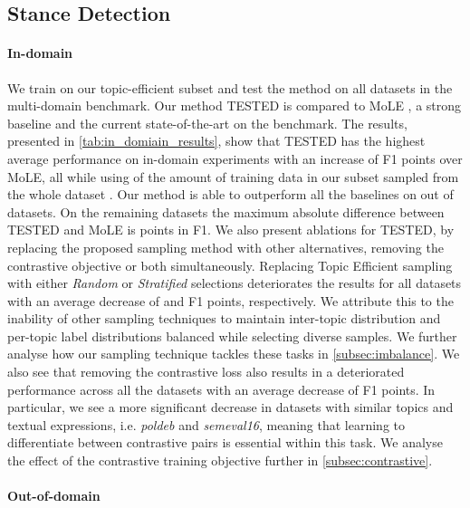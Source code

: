 \documentclass[11pt]{article}
\begin{document}
\subsection{Stance Detection}

\paragraph{In-domain}

We train on our topic-efficient subset  and test the method on all datasets  in the multi-domain benchmark. Our method TESTED is compared to MoLE \citep{hardalov2021cross}, a strong baseline and the current state-of-the-art on the benchmark. The results, presented in \autoref{tab:in_domiain_results}, show that TESTED has the highest average performance on in-domain experiments with an increase of  F1 points over MoLE, all while using  of the amount of training data in our subset  sampled from the whole dataset . Our method is able to outperform all the baselines on  out of  datasets. On the remaining  datasets the maximum absolute difference between TESTED and MoLE is  points in F1. We also present ablations for TESTED, by replacing the proposed sampling method with other alternatives, removing the contrastive objective or both simultaneously. Replacing Topic Efficient sampling with either \emph{Random} or \emph{Stratified} selections deteriorates the results for all datasets with an average decrease of  and  F1 points, respectively. We attribute this to the inability of other sampling techniques to maintain inter-topic distribution and per-topic label distributions balanced while selecting diverse samples. We further analyse how our sampling technique tackles these tasks in \autoref{subsec:imbalance}. We also see that removing the contrastive loss also results in a deteriorated performance across all the datasets with an average decrease of  F1 points. In particular, we see a more significant decrease in datasets with similar topics and textual expressions, i.e. \emph{poldeb} and \emph{semeval16}, meaning that learning to differentiate between contrastive pairs is essential within this task. We analyse the effect of the contrastive training objective further in \autoref{subsec:contrastive}.




\paragraph{Out-of-domain}
\end{document}

